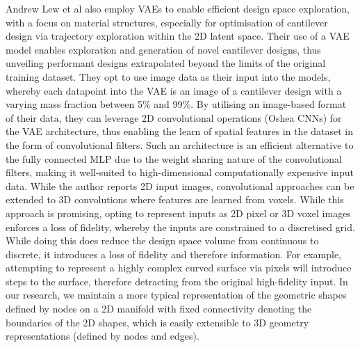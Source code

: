 \documentclass{article}
\begin{document}
Andrew Lew et al also employ VAEs to enable efficient design space exploration, with a focus on material structures, especially for optimisation of cantilever design via trajectory exploration within the 2D latent space. Their use of a VAE model enables exploration and generation of novel cantilever designs, thus unveiling performant designs extrapolated beyond the limits of the original training dataset. They opt to use image data as their input into the models, whereby each datapoint into the VAE is an image of a cantilever design with a varying mass fraction between 5\% and 99\%. By utilising an image-based format of their data, they can leverage 2D convolutional operations (Oshea CNNs) for the VAE architecture, thus enabling the learn of spatial features in the dataset in the form of convolutional filters. Such an architecture is an efficient alternative to the fully connected MLP due to the weight sharing nature of the convolutional filters, making it well-suited to high-dimensional computationally expensive input data. While the author reports 2D input images, convolutional approaches can be extended to 3D convolutions where features are learned from voxels. While this approach is promising, opting to represent inputs as 2D pixel or 3D voxel images enforces a loss of fidelity, whereby the inputs are constrained to a discretised grid. While doing this does reduce the design space volume from continuous to discrete, it introduces a loss of fidelity and therefore information. For example, attempting to represent a highly complex curved surface via pixels will introduce steps to the surface, therefore detracting from the original high-fidelity input. In our research, we maintain a more typical  representation of the geometric shapes defined by nodes on a 2D manifold with fixed connectivity denoting the boundaries of the 2D shapes, which is easily extensible to 3D geometry representations (defined by nodes and edges).



\newpage
\end{document}
